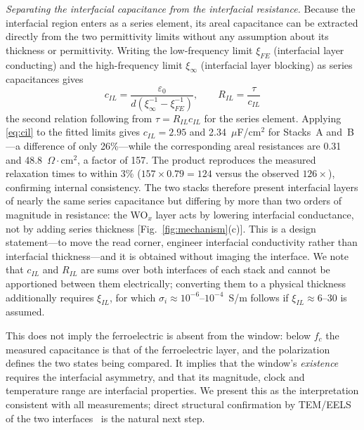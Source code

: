 \documentclass[journal]{IEEEtran}
\newcommand{\fc}{f_{c}}
\begin{document}
\textit{Separating the interfacial capacitance from the interfacial
resistance.} Because the interfacial region enters as a series element, its
areal capacitance can be extracted directly from the two permittivity limits
without any assumption about its thickness or permittivity. Writing the
low-frequency limit $\xi_{FE}$ (interfacial layer conducting) and the
high-frequency limit $\xi_\infty$ (interfacial layer blocking) as series
capacitances gives
\begin{equation}
c_{IL} = \frac{\varepsilon_0}{d\left(\xi_\infty^{-1}-\xi_{FE}^{-1}\right)},
\qquad
R_{IL} = \frac{\tau}{c_{IL}}
\label{eq:cil}
\end{equation}
the second relation following from $\tau = R_{IL}c_{IL}$ for the series
element. Applying \eqref{eq:cil} to the fitted limits gives
$c_{IL} = 2.95$ and 2.34~$\mu$F/cm$^2$ for Stacks~A and~B---a difference of
only 26\%---while the corresponding areal resistances are 0.31 and
48.8~$\Omega\cdot$cm$^2$, a factor of 157. The product reproduces the measured
relaxation times to within 3\% ($157 \times 0.79 = 124$ versus the observed
$126\times$), confirming internal consistency. The two stacks therefore
present interfacial layers of nearly the same series capacitance but
differing by more than two orders of magnitude in resistance: the WO$_x$
layer acts by lowering interfacial conductance, not by adding series
thickness [Fig.~\ref{fig:mechanism}(c)]. This is a design statement---to move the read corner, engineer
interfacial conductivity rather than interfacial thickness---and it is
obtained without imaging the interface. We note that $c_{IL}$ and $R_{IL}$
are sums over both interfaces of each stack and cannot be apportioned between
them electrically; converting them to a physical thickness additionally
requires $\xi_{IL}$, for which $\sigma_i \approx 10^{-6}$--$10^{-4}$~S/m
follows if $\xi_{IL} \approx 6$--30 is assumed.

This does not imply the ferroelectric is absent from the window: below $\fc$
the measured capacitance is that of the ferroelectric layer, and the
polarization defines the two states being compared. It implies that the
window's \emph{existence} requires the interfacial asymmetry, and that its
magnitude, clock and temperature range are interfacial properties. We present
this as the interpretation consistent with all measurements; direct
structural confirmation by TEM/EELS of the two
interfaces~\cite{iung2025,kumar2025review,das2026paradox} is the natural next
step.
\end{document}
